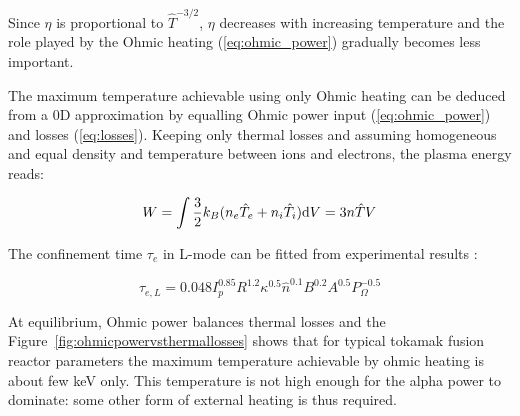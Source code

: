 Since $\eta$ is proportional to $\hat T^{-3/2}$, $\eta$ decreases with increasing temperature and the role played by the Ohmic heating (\ref{eq:ohmic_power}) gradually becomes less important. 


The maximum temperature achievable using only Ohmic heating can be deduced from a 0D approximation by equalling Ohmic power input (\ref{eq:ohmic_power}) and losses (\ref{eq:losses}). Keeping only thermal losses and assuming homogeneous and equal density and temperature between ions and electrons, the plasma energy reads: 

\begin{equation}\label{eq:plasma_energy}
W 
= \int \frac{3}{2} k_B (n_e \hat T_e + n_i \hat T_i) {\mathrm{d}} V 
=
 3 n \hat{T} V
\end{equation}

The confinement time $\tau_e$ in L-mode can be fitted from experimental results \cite[Eq.(14.155)]{Freidberg2007}:

\begin{equation}\label{eq:tau_e_modeL}
\tau_{e,L}
=
0.048  I_p^{0.85} R^{1.2} \kappa^{0.5} \hat n^{0.1} B^{0.2} A^{0.5} P_\Omega^{-0.5}
\end{equation}  

At equilibrium, Ohmic power balances thermal losses and the Figure~\ref{fig:ohmicpowervsthermallosses} shows that for typical tokamak fusion reactor parameters
the maximum temperature achievable by ohmic heating is about few keV only. This temperature is not high enough for the alpha power to dominate: some other form of external heating is thus required. 

